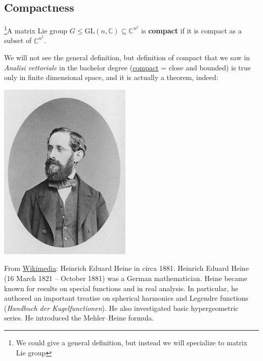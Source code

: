 \documentclass[../main.tex]{subfiles}
\begin{document}
\subsection{Compactness}
\begin{definition}\footnote{We could give a general definition, but instead we will specialize to matrix Lie group}A matrix Lie group $G\leq \textrm{GL}(n,\mathbb{C}) \subseteq \mathbb{C}^{n^2}$ is \textbf{compact} if it is compact as a subset of $\mathbb{C}^{n^2}$.
\end{definition}
We will not see the general definition, but definition of compact that we saw in \textit{Analisi vettoriale} in the bachelor degree (\href{https://it.wikipedia.org/wiki/Spazio_compatto#Compattezza_di_spazi_euclidei}{compact} = close and bounded) is true only in finite dimensional space, and it is actually a theorem, indeed:
\begin{marginfigure}[-20mm]
	\includegraphics[width=1\linewidth]{images/Heinrich_Eduard_Heine_1.jpg}
	\caption[Heinrich Eduard Heine (1821-1881). Circa 1881]{From \href{https://commons.wikimedia.org/wiki/File:Heinrich_Eduard_Heine_1.jpg}{Wikimedia}: Heinrich Eduard Heine in circa 1881. Heinrich Eduard Heine (16 March 1821 – October 1881) was a German mathematician. Heine became known for results on special functions and in real analysis. In particular, he authored an important treatise on spherical harmonics and Legendre functions (\textit{Handbuch der Kugelfunctionen}). He also investigated basic hypergeometric series. He introduced the Mehler–Heine formula.}
\end{marginfigure}
\end{document}
